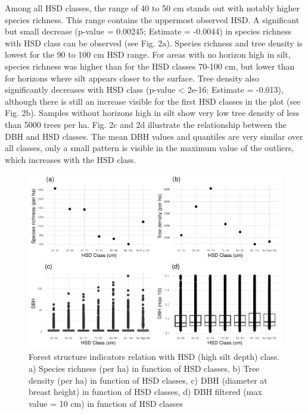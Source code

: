 \documentclass[fleqn,12pt]{latex/stylish_article} %
\begin{document}
Among all HSD classes, the range of 40 to 50 cm stands out with notably higher species richness. This range contains the uppermost observed HSD. A significant but small decrease (p-value = 0.00245; Estimate = -0.0044) in species richness with HSD class can be observed (see Fig. 2a). Species richness and tree density is lowest for the 90 to 100 cm HSD range. For areas with no horizon high in silt, species richness was higher than for the HSD classes 70-100 cm, but lower than for horizons where silt appears closer to the surface. Tree density also significantly decreases with HSD class (p-value \textless{} 2e-16; Estimate = -0.013), although there is still an increase visible for the first HSD classes in the plot (see Fig. 2b). Samples without horizons high in silt show very low tree density of less than 5000 trees per ha.
Fig. 2c and 2d illustrate the relationship between the DBH and HSD classes. The mean DBH values and quantiles are very similar over all classes, only a small pattern is visible in the maximum value of the outliers, which increases with the HSD class.



\scriptsize

\begin{figure}

{\centering \includegraphics[width=0.8\linewidth,]{pedoP16-report_files/figure-latex/auger-1} 

}

\caption{Forest structure indicators relation with HSD (high silt depth) class. a) Species richness (per ha) in function of HSD classes, b) Tree density (per ha) in function of HSD classes, c) DBH (diameter at breast height) in function of HSD classes, d) DBH filtered (max value = 10 cm) in function of HSD classes}\label{fig:auger}
\end{figure}
\end{document}
